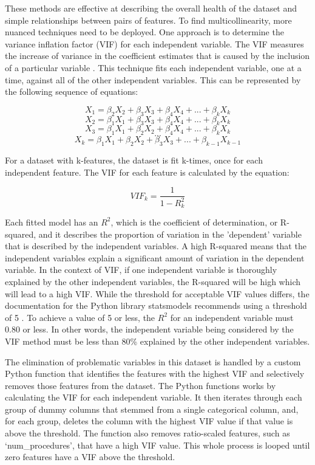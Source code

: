\documentclass[sigconf]{acmart}
\begin{document}
These methods are effective at describing the overall health of the dataset and simple relationships between pairs of features. To find multicollinearity, more nuanced techniques need to be deployed. One approach is to determine the variance inflation factor (VIF) for each independent variable. The VIF measures the increase of variance in the coefficient estimates that is caused by the inclusion of a particular variable \cite{cite15}. This technique fits each independent variable, one at a time, against all of the other independent variables. This can be represented by the following sequence of equations:

\[X_1 = \beta_2X_2 + \beta_3X_3 + \beta_4X_4 + ... + \beta_kX_k \]
\[X_2 = \beta_1X_1 + \beta_3X_3 + \beta_4X_4 + ... + \beta_kX_k \]
\[X_3 = \beta_1X_1 + \beta_2X_2 + \beta_4X_4 + ... + \beta_kX_k \]
\[...\]
\[X_k = \beta_1X_1 + \beta_2X_2 + \beta_3X_3 + ... + \beta_{k-1}X_{k-1} \]

For a dataset with k-features, the dataset is fit k-times, once for each independent feature. The VIF for each feature is calculated by the equation:

\[ VIF_k =\frac{1}{1 - R^2_k}\]

Each fitted model has an \(R^2\), which is the coefficient of determination, or R-squared, and it describes the proportion of variation in the 'dependent' variable that is described by the independent variables. A high R-squared means that the independent variables explain a significant amount of variation in the dependent variable. In the context of VIF, if one independent variable is thoroughly explained by the other independent variables, the R-squared will be high which will lead to a high VIF. While the threshold for acceptable VIF values differs, the documentation for the Python library statsmodels recommends using a threshold of 5 \cite{cite15}. To achieve a value of 5 or less, the \(R^2\) for an independent variable must 0.80 or less. In other words, the independent variable being considered by the VIF method must be less than 80\% explained by the other independent variables.

The elimination of problematic variables in this dataset is handled by a custom Python function that identifies the features with the highest VIF and selectively removes those features from the dataset. The Python functions works by calculating the VIF for each independent variable. It then iterates through each group of dummy columns that stemmed from a single categorical column, and, for each group, deletes the column with the highest VIF value if that value is above the threshold. The function also removes ratio-scaled features, such as `num\_procedures', that have a high VIF value. This whole process is looped until zero features have a VIF above the threshold.
\end{document}
